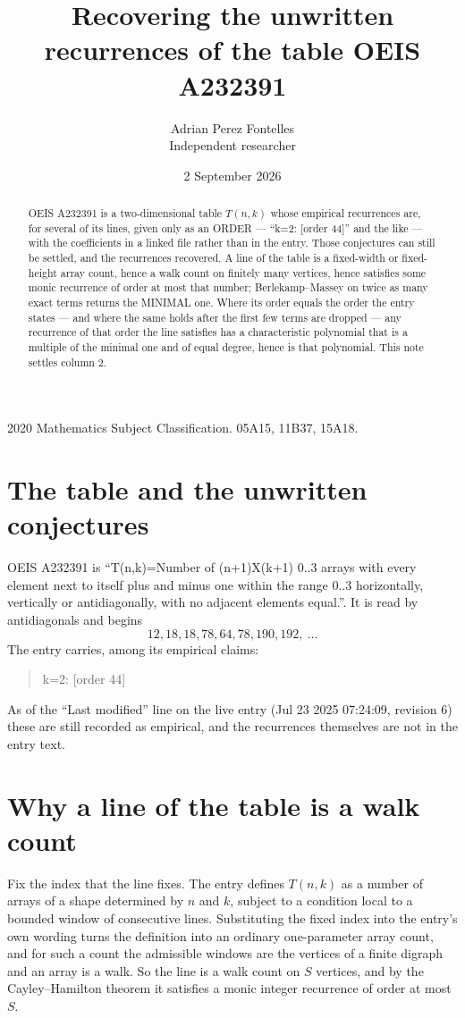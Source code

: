 \documentclass[11pt,a4paper]{article}
\title{Recovering the unwritten recurrences of the table OEIS A232391}
\author{Adrian Perez Fontelles\\ \small Independent researcher}
\date{2 September 2026}
\theoremstyle{plain}
\theoremstyle{definition}
\begin{document}
\maketitle

\begin{abstract}
OEIS A232391 is a two-dimensional table $T(n,k)$ whose empirical recurrences are, for several of
its lines, given only as an ORDER --- ``k=2: [order 44]'' and the like --- with the
coefficients in a linked file rather than in the entry. Those conjectures can still be settled,
and the recurrences recovered. A line of the table is a fixed-width or fixed-height array
count, hence a walk count on finitely many vertices, hence satisfies some monic recurrence of
order at most that number; Berlekamp--Massey on twice as many exact terms returns the MINIMAL
one. Where its order equals the order the entry states --- and where the same holds after the
first few terms are dropped --- any recurrence of that order the line satisfies has a
characteristic polynomial that is a multiple of the minimal one and of equal degree, hence is
that polynomial. This note settles column 2.
\end{abstract}

\noindent\small 2020 Mathematics Subject Classification. 05A15, 11B37, 15A18.\normalsize

\section{The table and the unwritten conjectures}

OEIS A232391 is ``T(n,k)=Number of (n+1)X(k+1) 0..3 arrays with every element next to itself plus and minus one within the range 0..3 horizontally, vertically or antidiagonally, with no adjacent elements equal.''. It is read by antidiagonals and begins
\[
12, 18, 18, 78, 64, 78, 190, 192,\ \dots
\]
The entry carries, among its empirical claims:
\begin{quote}\small
k=2: [order 44]
\end{quote}
As of the ``Last modified'' line on the live entry (Jul 23 2025 07:24:09, revision 6) these are still
recorded as empirical, and the recurrences themselves are not in the entry text.

\section{Why a line of the table is a walk count}

Fix the index that the line fixes. The entry defines $T(n,k)$ as a number of arrays of a shape
determined by $n$ and $k$, subject to a condition local to a bounded window of consecutive
lines. Substituting the fixed index into the entry's own wording turns the definition into an
ordinary one-parameter array count, and for such a count the admissible windows are the
vertices of a finite digraph and an array is a walk. So the line is a walk count on $S$
vertices, and by the Cayley--Hamilton theorem it satisfies a monic integer recurrence of order
at most $S$.
\end{document}
